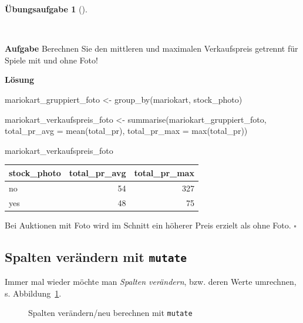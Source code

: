 \documentclass[
  letterpaper,
  twoside,
  open=any]{scrbook}
\newenvironment{Shaded}{\begin{snugshade}}{\end{snugshade}}
\newcommand{\AttributeTok}[1]{\textcolor[rgb]{0.40,0.45,0.13}{#1}}
\newcommand{\FunctionTok}[1]{\textcolor[rgb]{0.28,0.35,0.67}{#1}}
\newcommand{\NormalTok}[1]{\textcolor[rgb]{0.00,0.23,0.31}{#1}}
\newcommand{\OtherTok}[1]{\textcolor[rgb]{0.00,0.23,0.31}{#1}}
\theoremstyle{definition}
\newtheorem{exercise}{Übungsaufgabe}[chapter]
\theoremstyle{definition}
\theoremstyle{definition}
\theoremstyle{remark}
\begin{document}
\begin{exercise}[]\protect\hypertarget{exr-groupby}{}\label{exr-groupby}

~

\textbf{Aufgabe} Berechnen Sie den mittleren und maximalen Verkaufspreis
getrennt für Spiele mit und ohne Foto!

\textbf{Lösung}

\begin{Shaded}
\begin{Highlighting}[]
\NormalTok{mariokart\_gruppiert\_foto }\OtherTok{\textless{}{-}} \FunctionTok{group\_by}\NormalTok{(mariokart, stock\_photo)}

\NormalTok{mariokart\_verkaufspreis\_foto }\OtherTok{\textless{}{-}} 
  \FunctionTok{summarise}\NormalTok{(mariokart\_gruppiert\_foto,}
            \AttributeTok{total\_pr\_avg =} \FunctionTok{mean}\NormalTok{(total\_pr),}
            \AttributeTok{total\_pr\_max =} \FunctionTok{max}\NormalTok{(total\_pr))}

\NormalTok{mariokart\_verkaufspreis\_foto}
\end{Highlighting}
\end{Shaded}

\begin{longtable}[]{@{}lrr@{}}
\toprule\noalign{}
stock\_photo & total\_pr\_avg & total\_pr\_max \\
\midrule\noalign{}
\endhead
\bottomrule\noalign{}
\endlastfoot
no & 54 & 327 \\
yes & 48 & 75 \\
\end{longtable}

Bei Auktionen mit Foto wird im Schnitt ein höherer Preis erzielt als
ohne Foto. \(\square\)

\end{exercise}

\subsection{\texorpdfstring{Spalten verändern mit
\texttt{mutate}}{Spalten verändern mit mutate}}\label{spalten-veruxe4ndern-mit-mutate}

Immer mal wieder möchte man \emph{Spalten verändern}, bzw. deren Werte
umrechnen, s. Abbildung~\ref{fig-mutate}.

\begin{figure}


\caption{\label{fig-mutate}Spalten verändern/neu berechnen mit
\texttt{mutate}}

\end{figure}%
\end{document}
